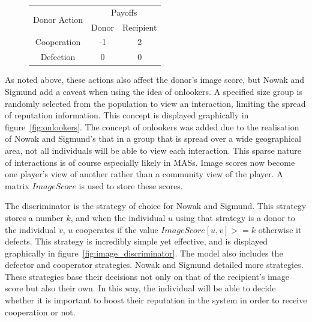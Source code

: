 \documentclass[]{final_report}
\begin{document}
\begin{figure}
\vspace{-20pt}
\begin{framed}
	\begin{center}
		\begin{tabular}{c|c|c}
		\multirow{2}{*}{Donor Action} & \multicolumn{2}{c}{Payoffs}\\	
		& Donor & Recipient\\
		\hline
		Cooperation & -1 & 2\\
		\hline
		Defection & 0 & 0\\
		\end{tabular}
		\label{tab:indirrec_payoffmatrix}
	\end{center}	
\end{framed}
\vspace{-20pt}
\end{figure}
As noted above, these actions also affect the donor's image score, but Nowak and Sigmund add a caveat when using the idea of onlookers. A specified size group is randomly selected from the population to view an interaction, limiting the spread of reputation information. This concept is displayed graphically in figure~\ref{fig:onlookers}. The concept of onlookers was added due to the realisation of Nowak and Sigmund's that in a group that is spread over a wide geographical area, not all individuals will be able to view each interaction. This sparse nature of interactions is of course especially likely in MASs. Image scores now become one player's view of another rather than a community view of the player. A matrix $ImageScore$ is used to store these scores.\par
The discriminator is the strategy of choice for Nowak and Sigmund. This strategy stores a number $k$, and when the individual $u$ using that strategy is a donor to the individual $v$, $u$ cooperates if the value $ImageScore[u,v]>=k$ otherwise it defects. This strategy is incredibly simple yet effective, and is displayed graphically in figure~\ref{fig:image_discriminator}. The model also includes the defector and cooperator strategies. Nowak and Sigmund detailed more strategies. These strategies base their decisions not only on that of the recipient's image score but also their own. In this way, the individual will be able to decide whether it is important to boost their reputation in the system in order to receive cooperation or not.\par
\end{document}
